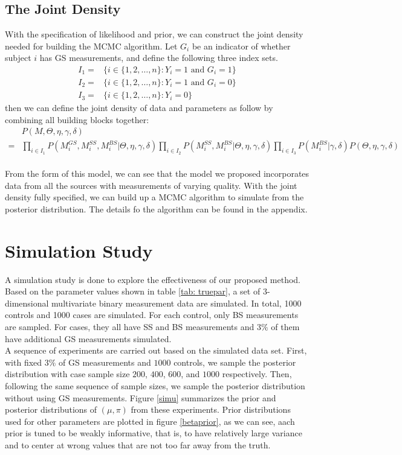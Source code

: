 \documentclass[11 pt, a4paper]{article}  %
\begin{document}
\subsection{The Joint Density}
With the specification of likelihood and prior, we can construct the joint density needed for building the MCMC algorithm. Let $G_i$ be an indicator of whether subject $i$ has GS measurements, and define the following three index sets.
\begin{align*}
I_1 = & \Big \{i \in \{1,2,\ldots, n\}: Y_i=1 \text{ and } G_i=1 \Big\}\\
I_2 = & \Big \{i \in \{1,2,\ldots, n\}: Y_i=1 \text{ and } G_i=0 \Big\}\\
I_3 = & \Big \{i \in \{1,2,\ldots, n\}: Y_i=0 \Big\}
\end{align*}
then we can define the joint density of data and parameters as follow by combining all building blocks together:
\begin{align*}
& P(M,\Theta, \eta, \gamma, \delta) \\
= & \prod_{i\in I_1} P(M_i^{GS},M_i^{SS},M_i^{BS} | \Theta, \eta, \gamma, \delta) 
\prod_{i\in I_2} P(M_i^{SS},M_i^{BS} |\Theta, \eta, \gamma, \delta)
\prod_{i\in I_3} P(M_i^{BS} |\gamma, \delta) P(\Theta, \eta, \gamma, \delta)
\end{align*}
\\
From the form of this model, we can see that the model we proposed incorporates data from all the sources with measurements of varying quality. With the joint density fully specified, we can build up a MCMC algorithm to simulate from the posterior distribution. The details fo the algorithm can be found in the appendix.



\newpage
\section{Simulation Study}
A simulation study is done to explore the effectiveness of our proposed method. Based on the parameter values shown in table \ref{tab: truepar}, a set of 3-dimensional multivariate binary measurement data are simulated. In total, 1000 controls and 1000 cases are simulated.  For each control, only BS measurements are sampled. For cases, they all have SS and BS measurements and $3\%$ of them have additional GS measurements simulated. \\

A sequence of experiments are carried out based on the simulated data set. First, with fixed $3\%$ of GS measurements and $1000$ controls, we sample the posterior distribution with case sample size $200$, $400$, $600$, and $1000$ respectively. Then, following the same sequence of sample sizes, we sample the posterior distribution without using GS measurements. Figure \ref{simu} summarizes the prior and posterior distributions of $(\mu, \pi)$ from these experiments. Prior distributions used for other parameters are plotted in figure \ref{betaprior}, as we can see, aach prior is tuned to be weakly informative, that is, to have relatively large variance and to center at wrong values that are not too far away from the truth.\\
\end{document}
